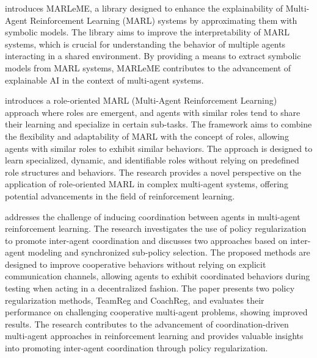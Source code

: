 \documentclass[runningheads]{llncs}
\begin{document}
\cite{Kazhdan2020} introduces MARLeME, a library designed to enhance the explainability of Multi-Agent Reinforcement Learning (MARL) systems by approximating them with symbolic models. The library aims to improve the interpretability of MARL systems, which is crucial for understanding the behavior of multiple agents interacting in a shared environment. By providing a means to extract symbolic models from MARL systems, MARLeME contributes to the advancement of explainable AI in the context of multi-agent systems.

\cite{Wang2020} introduces a role-oriented MARL (Multi-Agent Reinforcement Learning) approach where roles are emergent, and agents with similar roles tend to share their learning and specialize in certain sub-tasks. The framework aims to combine the flexibility and adaptability of MARL with the concept of roles, allowing agents with similar roles to exhibit similar behaviors. The approach is designed to learn specialized, dynamic, and identifiable roles without relying on predefined role structures and behaviors. The research provides a novel perspective on the application of role-oriented MARL in complex multi-agent systems, offering potential advancements in the field of reinforcement learning.

\cite{Roy2020} addresses the challenge of inducing coordination between agents in multi-agent reinforcement learning. The research investigates the use of policy regularization to promote inter-agent coordination and discusses two approaches based on inter-agent modeling and synchronized sub-policy selection. The proposed methods are designed to improve cooperative behaviors without relying on explicit communication channels, allowing agents to exhibit coordinated behaviors during testing when acting in a decentralized fashion. The paper presents two policy regularization methods, TeamReg and CoachReg, and evaluates their performance on challenging cooperative multi-agent problems, showing improved results. The research contributes to the advancement of coordination-driven multi-agent approaches in reinforcement learning and provides valuable insights into promoting inter-agent coordination through policy regularization.
\end{document}
